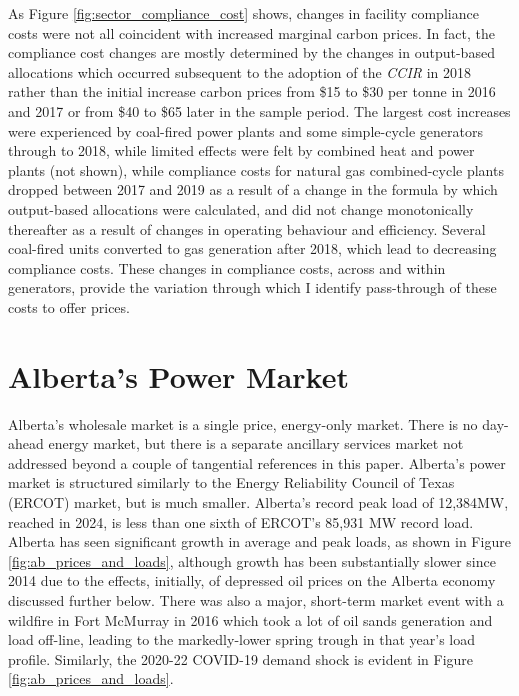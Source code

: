 \documentclass[12pt]{article}
\newcommand{\coe}{\text{CO$_2$e}}
\begin{document}
As Figure \ref{fig:sector_compliance_cost} shows, changes in facility compliance costs were not all coincident with increased marginal carbon prices. In fact, the compliance cost changes are mostly determined by the changes in output-based allocations which occurred subsequent to the adoption of the \emph{CCIR} in 2018 rather than the initial increase carbon prices from \$15 to \$30 per tonne \coe in 2016 and 2017 or from \$40 to \$65 later in the sample period. The largest cost increases were experienced by coal-fired power plants and some simple-cycle generators through to 2018, while limited effects were felt by combined heat and power plants (not shown), while compliance costs for natural gas combined-cycle plants dropped between 2017 and 2019 as a result of a change in the formula by which output-based allocations were calculated, and did not change monotonically thereafter as a result of changes in operating behaviour and efficiency. Several coal-fired units converted to gas generation after 2018, which lead to decreasing compliance costs. These changes in compliance costs, across and within generators, provide the variation through which I identify pass-through of these costs to offer prices.

\section{Alberta's Power Market}\label{sec:market}

Alberta's wholesale market is a single price, energy-only market. There is no day-ahead energy market, but there is a separate ancillary services market not addressed beyond a couple of tangential references in this paper. Alberta's power market is structured similarly to the Energy Reliability Council of Texas (ERCOT) market, but is much smaller. Alberta's record peak load of 12,384MW, reached in 2024, is less than one sixth of ERCOT's 85,931 MW record load. Alberta has seen significant growth in average and peak loads, as shown in Figure \ref{fig:ab_prices_and_loads}, although growth has been substantially slower since 2014 due to the effects, initially, of depressed oil prices on the Alberta economy discussed further below. There was also a major, short-term market event with a wildfire in Fort McMurray in 2016 which took a lot of oil sands generation and load off-line, leading to the markedly-lower spring trough in that year's load profile. Similarly, the 2020-22 COVID-19 demand shock is evident in Figure \ref{fig:ab_prices_and_loads}. 
\end{document}
